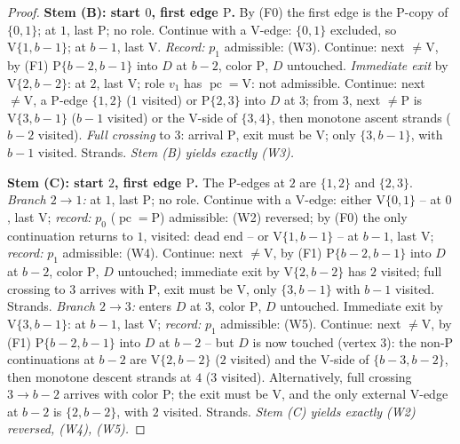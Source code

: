 \documentclass[11pt]{article}
\theoremstyle{definition}
\DeclareMathOperator{\pc}{pc}
\begin{document}
\begin{proof}
\smallskip
\noindent\textbf{Stem (B): start $0$, first edge $\mathrm P$.} By (F0) the first edge
is the P-copy of $\{0,1\}$; at $1$, last $\mathrm P$; no role. Continue with a V-edge:
$\{0,1\}$ excluded, so $\mathrm V\{1,b-1\}$; at $b-1$, last $\mathrm V$.
\emph{Record:} $p_1$ admissible: (W3). Continue: next $\ne \mathrm V$, by (F1)
$\mathrm P\{b-2,b-1\}$ into $D$ at $b-2$, color $\mathrm P$, $D$ untouched.
\emph{Immediate exit} by $\mathrm V\{2,b-2\}$: at $2$, last $\mathrm V$; role $v_1$
has $\pc = \mathrm V$: not admissible. Continue: next $\ne \mathrm V$, a P-edge
$\{1,2\}$ ($1$ visited) or $\mathrm P\{2,3\}$ into $D$ at $3$; from $3$, next
$\ne \mathrm P$ is $\mathrm V\{3,b-1\}$ ($b-1$ visited) or the V-side of $\{3,4\}$,
then monotone ascent strands ($b-2$ visited). \emph{Full crossing} to $3$: arrival
$\mathrm P$, exit must be $\mathrm V$; only $\{3,b-1\}$, with $b-1$ visited. Strands.
\emph{Stem (B) yields exactly (W3).}

\smallskip
\noindent\textbf{Stem (C): start $2$, first edge $\mathrm P$.} The P-edges at $2$ are
$\{1,2\}$ and $\{2,3\}$.
\emph{Branch $2 \to 1$:} at $1$, last $\mathrm P$; no role. Continue with a V-edge:
either $\mathrm V\{0,1\}$ -- at $0$, last $\mathrm V$; \emph{record:} $p_0$
($\pc = \mathrm P$) admissible: (W2) reversed; by (F0) the only continuation returns
to $1$, visited: dead end -- or $\mathrm V\{1,b-1\}$ -- at $b-1$, last $\mathrm V$;
\emph{record:} $p_1$ admissible: (W4). Continue: next $\ne \mathrm V$, by (F1)
$\mathrm P\{b-2,b-1\}$ into $D$ at $b-2$, color $\mathrm P$, $D$ untouched; immediate
exit by $\mathrm V\{2,b-2\}$ has $2$ visited; full crossing to $3$ arrives with
$\mathrm P$, exit must be $\mathrm V$, only $\{3,b-1\}$ with $b-1$ visited. Strands.
\emph{Branch $2 \to 3$:} enters $D$ at $3$, color $\mathrm P$, $D$ untouched.
Immediate exit by $\mathrm V\{3,b-1\}$: at $b-1$, last $\mathrm V$; \emph{record:}
$p_1$ admissible: (W5). Continue: next $\ne \mathrm V$, by (F1)
$\mathrm P\{b-2,b-1\}$ into $D$ at $b-2$ -- but $D$ is now touched (vertex $3$): the
non-$\mathrm P$ continuations at $b-2$ are $\mathrm V\{2,b-2\}$ ($2$ visited) and the
V-side of $\{b-3,b-2\}$, then monotone descent strands at $4$ ($3$ visited).
Alternatively, full crossing $3 \to b-2$ arrives with color $\mathrm P$; the exit must
be $\mathrm V$, and the only external V-edge at $b-2$ is $\{2,b-2\}$, with $2$
visited. Strands.
\emph{Stem (C) yields exactly (W2) reversed, (W4), (W5).}


\end{proof}
\end{document}
